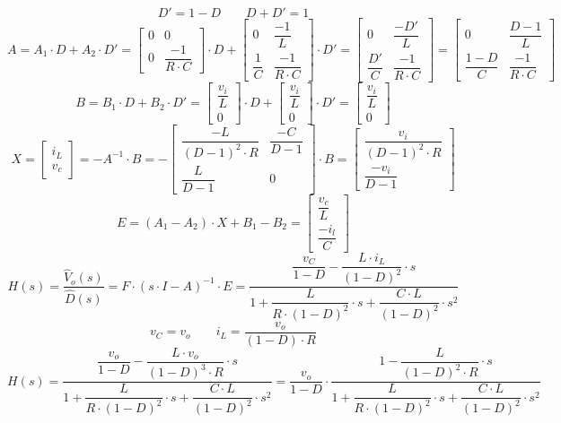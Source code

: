 \documentclass[a4paper,11pt,fleqn]{article}
\begin{document}
\[ D' = 1 - D \qquad D + D' = 1 \]
\[ A = A_1 \cdot D + A_2 \cdot D'
     = \begin{bmatrix}
            0 & 0 \\
            0 & \dfrac{-1}{R \cdot C}
        \end{bmatrix}
     \cdot D
     + \begin{bmatrix}
            0 & \dfrac{-1}{L} \\
            \dfrac{1}{C} & \dfrac{-1}{R \cdot C}
        \end{bmatrix}
     \cdot D'
     = \begin{bmatrix}
            0 & \dfrac{-D'}{L} \\
            \dfrac{D'}{C} & \dfrac{-1}{R \cdot C}
        \end{bmatrix}
     = \begin{bmatrix}
            0 & \dfrac{D-1}{L} \\
            \dfrac{1-D}{C} & \dfrac{-1}{R \cdot C}
        \end{bmatrix}
\]
\[ B = B_1 \cdot D + B_2 \cdot D'
     = \begin{bmatrix}
            \dfrac{v_i}{L} \\
            0
        \end{bmatrix}
     \cdot D 
     + \begin{bmatrix}
            \dfrac{v_i}{L} \\
            0
        \end{bmatrix}
     \cdot D'
     = \begin{bmatrix}
            \dfrac{v_i}{L} \\
            0
        \end{bmatrix}
\]
\[ X = \begin{bmatrix}i_L\\v_c\end{bmatrix} = -A^{-1} \cdot B 
     = -\begin{bmatrix}
            \dfrac{-L}{(D - 1)^2 \cdot R} & \dfrac{-C}{D - 1} \\
            \dfrac{L}{D-1} & 0
        \end{bmatrix} \cdot B
     = \begin{bmatrix}
            \dfrac{v_i}{(D - 1)^2 \cdot R} \\
            \dfrac{-v_i}{D-1}
        \end{bmatrix}
\]
\[ E = (A_1 - A_2) \cdot X + B_1 - B_2
     = \begin{bmatrix}
            \dfrac{v_c}{L} \\
            \dfrac{-i_l}{C}
        \end{bmatrix}
\]
\[ H(s) = \dfrac{\hat{V}_o(s)}{\hat{D}(s)} = F \cdot (s \cdot I - A)^{-1} \cdot E
    = \dfrac{\dfrac{v_C}{1 - D} - \dfrac{L \cdot i_L}{(1 - D)^2} \cdot s}
        {1 + \dfrac{L}{R \cdot (1 - D)^2} \cdot s + \dfrac{C \cdot L}{(1 - D)^2} \cdot s^2}
\]
\[ v_C = v_o \qquad i_L = \dfrac{v_o}{(1 - D) \cdot R} \]
\[ H(s) = \dfrac{\dfrac{v_o}{1 - D} - \dfrac{L \cdot v_o}{(1 - D)^3 \cdot R} \cdot s}
        {1 + \dfrac{L}{R \cdot (1 - D)^2} \cdot s + \dfrac{C \cdot L}{(1 - D)^2} \cdot s^2}
    = \dfrac{v_o}{1 - D} \cdot \dfrac{1 - \dfrac{L}{(1 - D)^2 \cdot R} \cdot s}
        {1 + \dfrac{L}{R \cdot (1 - D)^2} \cdot s + \dfrac{C \cdot L}{(1 - D)^2} \cdot s^2}
\]
\end{document}
